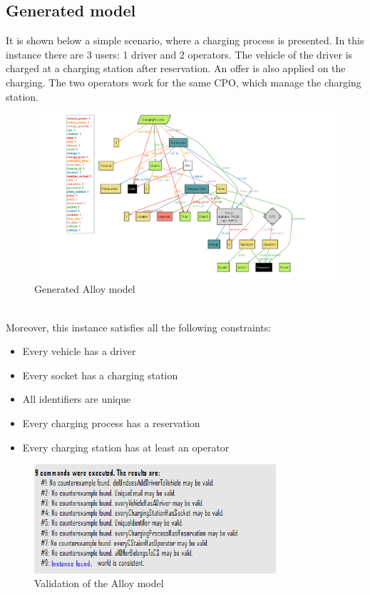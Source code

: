 \documentclass[../main.tex]{subfiles}
\begin{document}
\subsection{Generated model}
It is shown below a simple scenario, where a charging process is presented. In this instance there are 3 users: 1 driver and 2 operators. The vehicle of the driver is charged at a charging station after reservation. An offer is also applied on the charging. The two operators work for the same CPO, which manage the charging station.

\begin{figure}[H]
    \centering
    \includegraphics[width=\textwidth]{images/alloyworld.png}
    \caption{Generated Alloy model}
    \label{fig:class}
\end{figure}

\\
Moreover, this instance satisfies all the following constraints:

\begin{itemize}
    \item Every vehicle has a driver
    \item Every socket has a charging station
    \item All identifiers are unique
    \item Every charging process has a reservation
    \item Every charging station has at least an operator
\end{itemize}

\begin{figure}[H]
    \centering
    \includegraphics[width=0.8\textwidth]{images/constraints.png}
    \caption{Validation of the Alloy model}
    \label{fig:class}
\end{figure}
\end{document}
